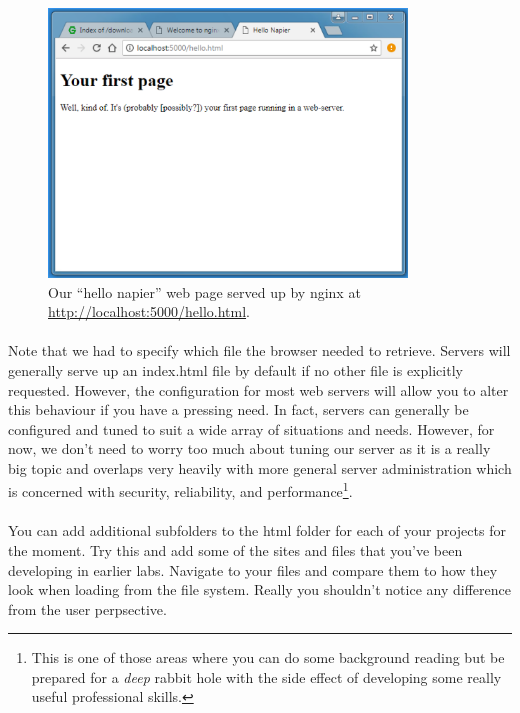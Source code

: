 \documentclass[10pt, a4paper, twosize]{article}
\begin{document}
\begin{figure}[H]
\centering
\includegraphics[width=0.85\textwidth]{images/nginx_hello}
\caption{Our ``hello napier'' web page served up by nginx at \url{http://localhost:5000/hello.html}.}
\label{fig:nginx_welcome}
\end{figure}

\paragraph{} Note that we had to specify which file the browser needed to retrieve. Servers will generally serve up an index.html file by default if no other file is explicitly requested. However, the configuration for most web servers will allow you to alter this behaviour if you have a pressing need. In fact, servers can generally be configured and tuned to suit a wide array of situations and needs. However, for now, we don't need to worry too much about tuning our server as it is a really big topic and overlaps very heavily with more general server administration which is concerned with security, reliability, and performance\footnote{This is one of those areas where you can do some background reading but be prepared for a \emph{deep} rabbit hole with the side effect of developing some really useful professional skills.}.

\paragraph{} You can add additional subfolders to the html folder for each of your projects for the moment. Try this and add some of the sites and files that you've been developing in earlier labs. Navigate to your files and compare them to how they look when loading from the file system. Really you shouldn't notice any difference from the user perpsective.
\end{document}
